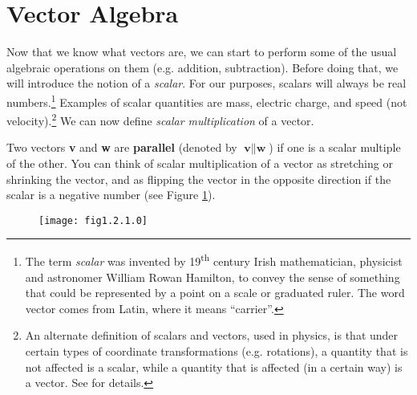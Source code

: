 \section{Vector Algebra}
Now that we know what vectors are, we can start to perform some of the usual algebraic operations on them (e.g.
addition, subtraction). Before doing that, we will introduce the notion of a \emph{scalar}.
For our purposes, scalars will always be real numbers.\footnote{The term \emph{scalar} was invented by
19\textsuperscript{th} century
Irish mathematician, physicist and astronomer William Rowan Hamilton, to convey the sense of something
that could be represented by a point
on a scale or graduated ruler. The word vector comes from Latin, where it means ``carrier''.} Examples of
scalar quantities are mass, electric charge, and speed (not velocity).\footnote{An alternate definition of
scalars and vectors, used in physics, is that under certain types of coordinate transformations (e.g. rotations), a
quantity that is not affected is a scalar, while a quantity that is affected (in a certain way) is a vector.
See \cite{mar} for details.}
We can now define \emph{scalar multiplication} of a vector.


Two vectors \textbf{v} and \textbf{w} are \textbf{parallel} (denoted by $\textbf{v} \parallel
\textbf{w}$) if one is a scalar multiple of the other.
You can think of scalar multiplication of a vector as stretching or shrinking
the vector, and as flipping the vector in the opposite direction if the scalar is a negative number
(see Figure \ref{fig:scalar}).

\begin{figure}[h]
 \begin{center}
  \texttt{[image: fig1.2.1.0]}
 \end{center}
 \caption[]{}
 \label{fig:scalar}
\end{figure}

